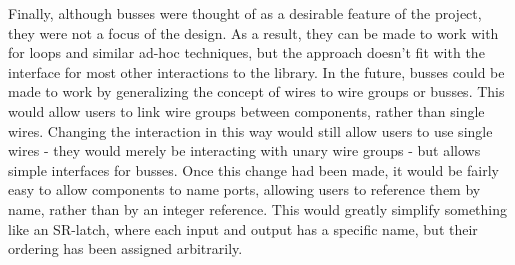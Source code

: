 \documentclass{article}
\begin{document}
Finally, although busses were thought of as a desirable feature of the project, they were not a focus of the design. As a result, they can be made to work with for loops and similar ad-hoc techniques, but the approach doesn’t fit with the interface for most other interactions to the library. In the future, busses could be made to work by generalizing the concept of wires to wire groups or busses. This would allow users to link wire groups between components, rather than single wires. Changing the interaction in this way would still allow users to use single wires - they would merely be interacting with unary wire groups - but allows simple interfaces for busses. Once this change had been made, it would be fairly easy to allow components to name ports, allowing users to reference them by name, rather than by an integer reference. This would greatly simplify something like an SR-latch, where each input and output has a specific name, but their ordering has been assigned arbitrarily.



\end{document}
